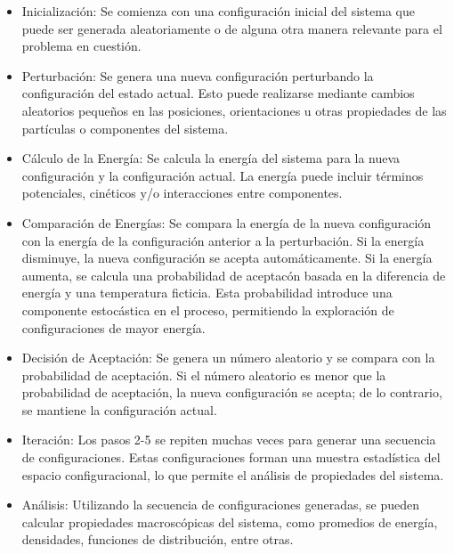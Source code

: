 \begin{itemize}
	
	
	\item Inicializaci\'on: Se comienza con una configuraci\'on inicial del sistema que puede ser generada aleatoriamente o de alguna otra manera relevante para el problema en cuesti\'on.
	
	\item Perturbaci\'on: Se genera una nueva configuraci\'on perturbando la configuraci\'on  del estado actual. Esto puede realizarse mediante cambios aleatorios peque\~nos en las posiciones, orientaciones u otras propiedades de las part\'iculas o componentes del sistema.
	
	\item C\'alculo de la Energ\'ia: Se calcula la energ\'ia del sistema para la nueva configuraci\'on y la configuraci\'on actual. La energ\'ia puede incluir t\'erminos potenciales, cin\'eticos y/o interacciones entre componentes.
	
	\item Comparaci\'on de Energ\'ias: Se compara la energ\'ia de la nueva configuraci\'on con la energ\'ia de la configuraci\'on anterior a la perturbaci\'on. Si la energ\'ia disminuye, la nueva configuraci\'on se acepta autom\'aticamente. Si la energ\'ia aumenta, se calcula una probabilidad de aceptac\'on basada en la diferencia de energ\'ia y una temperatura ficticia. Esta probabilidad introduce una componente estoc\'astica en el proceso, permitiendo la exploraci\'on de configuraciones de mayor energ\'ia.
	
	\item Decisi\'on de Aceptaci\'on: Se genera un n\'umero aleatorio y se compara con la probabilidad de aceptaci\'on. Si el n\'umero aleatorio es menor que la probabilidad de aceptaci\'on, la nueva configuraci\'on se acepta; de lo contrario, se mantiene la configuración actual.
	
	\item Iteraci\'on: Los pasos 2-5 se repiten muchas veces para generar una secuencia de configuraciones. Estas configuraciones forman una muestra estad\'istica del espacio configuracional, lo que permite el an\'alisis de propiedades del sistema.
	
	\item An\'alisis: Utilizando la secuencia de configuraciones generadas, se pueden calcular propiedades macrosc\'opicas del sistema, como promedios de energ\'ia, densidades, funciones de distribuci\'on, entre otras.
\end{itemize}

